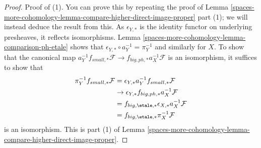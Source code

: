 \begin{proof}
Proof of (1). You can prove this by repeating the proof of
Lemma \ref{spaces-more-cohomology-lemma-compare-higher-direct-image-proper} part (1);
we will instead deduce the result from this.
As $\epsilon_{Y, *}$ is the identity functor on underlying presheaves,
it reflects isomorphisms. Lemma \ref{spaces-more-cohomology-lemma-comparison-ph-etale}
shows that $\epsilon_{Y, *} \circ a_Y^{-1} = \pi_Y^{-1}$
and similarly for $X$. To show that the canonical map
$a_Y^{-1}f_{small, *}\mathcal{F} \to f_{big, ph, *}a_X^{-1}\mathcal{F}$
is an isomorphism, it suffices to show that
\begin{align*}
\pi_Y^{-1}f_{small, *}\mathcal{F}
& =
\epsilon_{Y, *}a_Y^{-1}f_{small, *}\mathcal{F} \\
& \to
\epsilon_{Y, *}f_{big, ph, *}a_X^{-1}\mathcal{F} \\
& =
f_{big, \etale, *} \epsilon_{X, *}a_X^{-1}\mathcal{F} \\
& =
f_{big, \etale, *}\pi_X^{-1}\mathcal{F}
\end{align*}
is an isomorphism. This is part
(1) of Lemma \ref{spaces-more-cohomology-lemma-compare-higher-direct-image-proper}.


\end{proof}
